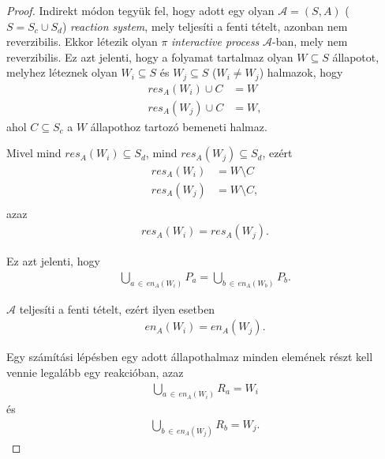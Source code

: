 \documentclass[12pt]{article}
\theoremstyle{definition}
\theoremstyle{remark}
\theoremstyle{plain}
\theoremstyle{plain}
\newcommand{\en}{\textit{en}}
\newcommand{\res}{\textit{res}}
\begin{document}
    \begin{proof}
        Indirekt módon tegyük fel, hogy adott egy olyan $\mathscr{A}=(S, A)$ ($S = S_{c} \cup S_{d}$) \textit{reaction system}, mely teljesíti a fenti tételt, azonban nem reverzibilis. Ekkor létezik olyan $\pi$ \textit{interactive process} $\mathscr{A}$-ban, mely nem reverzibilis. Ez azt jelenti, hogy a folyamat tartalmaz olyan $W \subseteq S$ állapotot, melyhez léteznek olyan $W_{i} \subseteq S$ és $W_{j} \subseteq S$ ($W_{i} \neq W_{j}$) halmazok, hogy
        \begin{align*}
            \res_{A}(W_{i}) \cup C &= W \\
            \res_{A}(W_{j}) \cup C &= W,
        \end{align*}
        ahol $C \subseteq S_{c}$ a $W$ állapothoz tartozó bemeneti halmaz. 
        
        Mivel mind $\res_{A}(W_{i}) \subseteq S_{d}$, mind $\res_{A}(W_{j}) \subseteq S_{d}$, ezért
        \begin{align*}
            \res_{A}(W_{i}) &= W \setminus C \\
            \res_{A}(W_{j}) &= W \setminus C, \\
        \end{align*}
        azaz
        \begin{align*}
            \res_{A}(W_{i}) = \res_{A}(W_{j}).
        \end{align*}

        Ez azt jelenti, hogy
        \begin{align*}
            \bigcup\limits_{a \,\in\, \en_{A}(W_{i})}P_{a} = \bigcup\limits_{b \,\in\, \en_{A}(W_{b})}P_{b}.
        \end{align*}

        $\mathscr{A}$ teljesíti a fenti tételt,  ezért ilyen esetben
        \begin{align*}
            \en_{A}(W_{i}) = \en_{A}(W_{j}).
        \end{align*}

        Egy számítási lépésben egy adott állapothalmaz minden elemének részt kell vennie legalább egy reakcióban, azaz
        \begin{align*}
            \bigcup\limits_{a \,\in\, \en_{A}(W_{i})} R_{a} = W_{i}
        \end{align*}
        és
        \begin{align*}
            \bigcup\limits_{b \,\in\, \en_{A}(W_{j})} R_{b} = W_{j}.
        \end{align*}


\end{proof}
\end{document}
